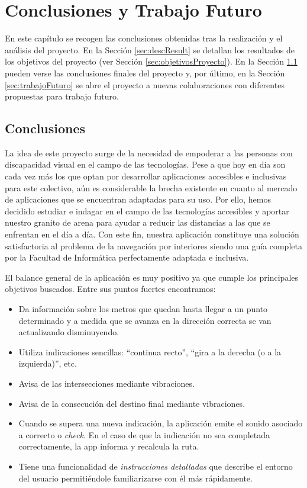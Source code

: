 \chapter{Conclusiones y Trabajo Futuro}
\label{cap:conclusiones}

En este capítulo se recogen las conclusiones obtenidas tras la realización y el análisis del proyecto. En la Sección \ref{sec:descResult} se detallan los resultados de los objetivos del proyecto (ver Sección \ref{sec:objetivosProyecto}). En la Sección \ref{sec:concluFinales} pueden verse las conclusiones finales del proyecto y, por último, en la Sección \ref{sec:trabajoFuturo} se abre el proyecto a nuevas colaboraciones con diferentes propuestas para trabajo futuro.

\section{Conclusiones}
\label{sec:concluFinales}

La idea de este proyecto surge de la necesidad de empoderar a las personas con discapacidad visual en el campo de las tecnologías. Pese a que hoy en día son cada vez más los que optan por desarrollar aplicaciones accesibles e inclusivas para este colectivo, aún es considerable la brecha existente en cuanto al mercado de aplicaciones que se encuentran adaptadas para su uso. Por ello, hemos decidido estudiar e indagar en el campo de las tecnologías accesibles y aportar nuestro granito de arena para ayudar a reducir las distancias a las que se enfrentan en el día a día. Con este fin, nuestra aplicación constituye una solución satisfactoria al problema de la navegación por interiores siendo una guía completa por la Facultad de Informática perfectamente adaptada e inclusiva.

El balance general de la aplicación es muy positivo ya que cumple los principales objetivos buscados. Entre sus puntos fuertes encontramos:
\begin{itemize}
	\item Da información sobre los metros que quedan hasta llegar a un punto determinado y a medida que se avanza en la dirección correcta se van actualizando disminuyendo.
	\item Utiliza indicaciones sencillas: ``continua recto'', ``gira a la derecha (o a la izquierda)'', etc.
	\item Avisa de las intersecciones mediante vibraciones.
	\item Avisa de la consecución del destino final mediante vibraciones.
	\item Cuando se supera una nueva indicación, la aplicación emite el sonido asociado a correcto o \textit{check}. En el caso de que la indicación no sea completada correctamente, la app informa y recalcula la ruta.
	\item Tiene una funcionalidad de \textit{instrucciones detalladas} que describe el entorno del usuario permitiéndole familiarizarse con él más rápidamente.
\end{itemize}

